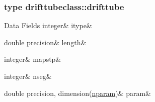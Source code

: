 \subsubsection{type drifttubeclass\+::drifttube}
\begin{DoxyFields}{Data Fields}
\mbox{\label{namespacedrifttubeclass_a1155bc20a840fce9a823eba951439db2}} 
integer&
itype&
\\
\hline

\mbox{\label{namespacedrifttubeclass_afec6676520da9cf2c2dd6a8298f8577b}} 
double precision&
length&
\\
\hline

\mbox{\label{namespacedrifttubeclass_a32a529cb8bf2da679620c46a2ac0bd6d}} 
integer&
mapstp&
\\
\hline

\mbox{\label{namespacedrifttubeclass_ac9c97374879fd6cd44d8ff391152ce6f}} 
integer&
nseg&
\\
\hline

\mbox{\label{namespacedrifttubeclass_abc755647bb29543bf6f4d65f7af740d4}} 
double precision, dimension(\mbox{\hyperlink{namespacedrifttubeclass_af382d7cef81496c1d2c2bf3ba72c4350}{nparam}})&
param&
\\
\hline

\end{DoxyFields}
